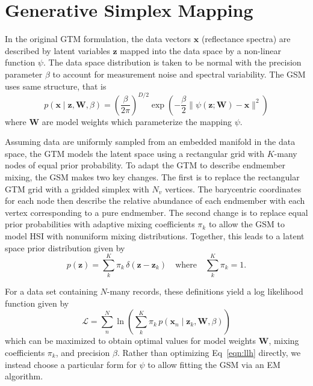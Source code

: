 \documentclass[remotesensing,article,submit,pdftex,moreauthors]{Definitions/mdpi}
\begin{document}
\section{Generative Simplex Mapping}\label{sec:gsm}

In the original GTM formulation, the data vectors $\mathbf{x}$ (reflectance spectra) are described by latent variables $\mathbf{z}$ mapped into the data space by a non-linear function $\psi$. The data space distribution is taken to be normal with the precision parameter $\beta$ to account for measurement noise and spectral variability. The GSM uses same structure, that is
\begin{equation}\label{eqn:data-space-distribution}
    p(\mathbf{x} \mid \mathbf{z}, \mathbf{W}, \beta) = \left(\frac{\beta}{2\pi} \right)^{D/2}\exp\left( -\frac{\beta}{2}\lVert \psi(\mathbf{z}; \mathbf{W}) - \mathbf{x} \rVert^2 \right)
\end{equation}
where $\mathbf{W}$ are model weights which parameterize the mapping $\psi$.

Assuming data are uniformly sampled from an embedded manifold in the data space, the GTM models the latent space using a rectangular grid with $K$-many nodes of equal prior probability. To adapt the GTM to describe endmember mixing, the GSM makes two key changes. The first is to replace the rectangular GTM grid with a gridded simplex with $N_v$ vertices. The barycentric coordinates for each node then describe the relative abundance of each endmember with each vertex corresponding to a pure endmember. The second change is to replace equal prior probabilities with adaptive mixing coefficients $\pi_k$ to allow the GSM to model HSI with nonuniform mixing distributions. Together, this leads to a latent space prior distribution given by
\begin{equation}\label{eqn:latent-distribution}
    p(\mathbf{z}) = \sum\limits_k^K \pi_k \, \delta(\mathbf{z} - \mathbf{z}_k) \quad\text{where}\quad  \sum_k^K\pi_k = 1.
\end{equation}

For a data set containing $N$-many records, these definitions yield a log likelihood function given by
\begin{equation}\label{eqn:llh}
    \mathcal{L} = \sum\limits_n^N \ln \left( \sum\limits_k^K \pi_k \, p(\mathbf{x}_n \mid \mathbf{z}_k, \mathbf{W}, \beta) \right)
\end{equation}
which can be maximized to obtain optimal values for model weights $\mathbf{W}$, mixing coefficients $\pi_k$, and precision $\beta$. Rather than optimizing Eq~\ref{eqn:llh} directly, we instead choose a particular form for $\psi$ to allow fitting the GSM via an EM algorithm.
\end{document}
